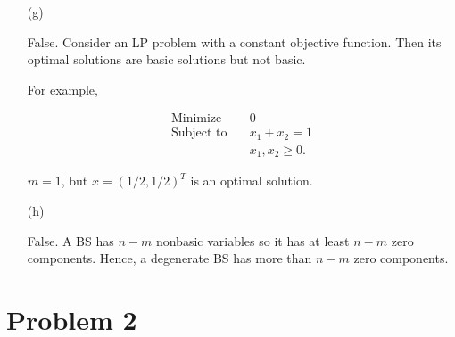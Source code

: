\documentclass[12pt]{article}
\begin{document}
\begin{enumerate}
\item[(g)]

False. Consider an LP problem with a constant objective function. Then its optimal solutions are basic solutions but not basic.

For example, 

$$
\begin{aligned}
\text{Minimize} \quad & 0 \\
\text{Subject to} \quad & x_1 + x_2 =1 \\
& x_1, x_2 \geqslant 0. 
\end{aligned}
$$

$m = 1$, but $x = (1/2, 1/2)^T$ is an optimal solution.

\item [(h)]

False. A BS has $n-m$ nonbasic variables so it has at least $n-m$ zero components. Hence, a degenerate BS has more than $n-m$ zero components.



\end{enumerate}

\section*{Problem 2}
\end{document}
